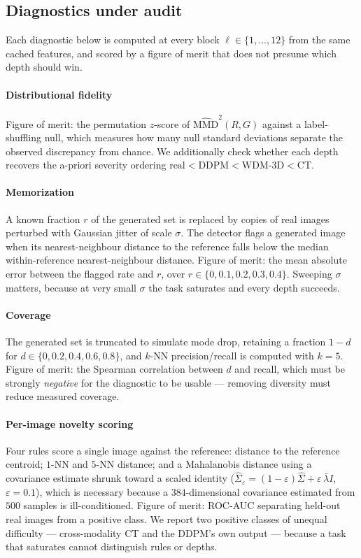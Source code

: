 \documentclass[preprint,12pt,authoryear]{elsarticle}
\newcommand{\mmd}{\mathrm{MMD}}
\begin{document}
\subsection{Diagnostics under audit}
\label{sec:diagnostics}

Each diagnostic below is computed at every block $\ell \in \{1,\dots,12\}$ from
the same cached features, and scored by a figure of merit that does not presume
which depth should win.

\paragraph{Distributional fidelity}
Figure of merit: the permutation $z$-score of $\widehat{\mmd}^2(R, G)$ against a
label-shuffling null, which measures how many null standard deviations separate
the observed discrepancy from chance. We additionally check whether each depth
recovers the a-priori severity ordering
$\text{real} < \text{DDPM} < \text{WDM-3D} < \text{CT}$.

\paragraph{Memorization}
A known fraction $r$ of the generated set is replaced by copies of real images
perturbed with Gaussian jitter of scale $\sigma$. The detector flags a generated
image when its nearest-neighbour distance to the reference falls below the
median within-reference nearest-neighbour distance. Figure of merit: the mean
absolute error between the flagged rate and $r$, over
$r \in \{0, 0.1, 0.2, 0.3, 0.4\}$. Sweeping $\sigma$ matters, because at very
small $\sigma$ the task saturates and every depth succeeds.

\paragraph{Coverage}
The generated set is truncated to simulate mode drop, retaining a fraction
$1-d$ for $d \in \{0, 0.2, 0.4, 0.6, 0.8\}$, and $k$-NN precision/recall
\citep{kynkaanniemi2019pr} is computed with $k=5$. Figure of merit: the
Spearman correlation between $d$ and recall, which must be strongly
\emph{negative} for the diagnostic to be usable --- removing diversity must
reduce measured coverage.

\paragraph{Per-image novelty scoring}
Four rules score a single image against the reference: distance to the
reference centroid; $1$-NN and $5$-NN distance; and a Mahalanobis distance using
a covariance estimate shrunk toward a scaled identity
($\hat\Sigma_\varepsilon = (1-\varepsilon)\hat\Sigma + \varepsilon\,\bar\lambda I$,
$\varepsilon = 0.1$), which is necessary because a $384$-dimensional covariance
estimated from $500$ samples is ill-conditioned. Figure of merit: ROC-AUC
separating held-out real images from a positive class. We report two positive
classes of unequal difficulty --- cross-modality CT and the DDPM's own output ---
because a task that saturates cannot distinguish rules or depths.
\end{document}
